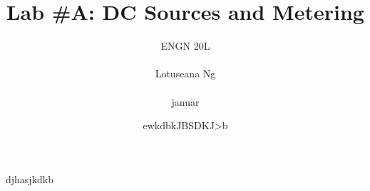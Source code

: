 \documentclass[12pt, letterpaper]{article}
\title{\textbf{Lab \#A: DC Sources and Metering}}
\author{
    ENGN 20L\\
    \ \\
    Lotuseana Ng\\
    \ \\ 
    januar
}
\date{ewkdbkJBSDKJ>b}
\begin{document}
\maketitle

 djhasjkdkb
\end{document}
